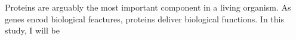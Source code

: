 Proteins are arguably the most important component in a living organism. As genes encod biological feactures, proteins deliver biological functions.    In this study, I will be 